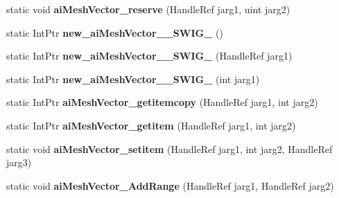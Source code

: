 \begin{DoxyCompactItemize}
\item 
\hypertarget{class_assimp_p_i_n_v_o_k_e_a12dee6d864676a34cd9805d45c8de3a4}{static void {\bfseries ai\+Mesh\+Vector\+\_\+reserve} (Handle\+Ref jarg1, uint jarg2)}\label{class_assimp_p_i_n_v_o_k_e_a12dee6d864676a34cd9805d45c8de3a4}

\item 
\hypertarget{class_assimp_p_i_n_v_o_k_e_a52559ff83c36f308f8678be63025acc4}{static Int\+Ptr {\bfseries new\+\_\+ai\+Mesh\+Vector\+\_\+\+\_\+\+S\+W\+I\+G\+\_} ()}\label{class_assimp_p_i_n_v_o_k_e_a52559ff83c36f308f8678be63025acc4}

\item 
\hypertarget{class_assimp_p_i_n_v_o_k_e_ab803f1850a9ef82ff76f1573cf144b76}{static Int\+Ptr {\bfseries new\+\_\+ai\+Mesh\+Vector\+\_\+\+\_\+\+S\+W\+I\+G\+\_} (Handle\+Ref jarg1)}\label{class_assimp_p_i_n_v_o_k_e_ab803f1850a9ef82ff76f1573cf144b76}

\item 
\hypertarget{class_assimp_p_i_n_v_o_k_e_a1f8a8a244150fac1e46321d5071c5dfd}{static Int\+Ptr {\bfseries new\+\_\+ai\+Mesh\+Vector\+\_\+\+\_\+\+S\+W\+I\+G\+\_} (int jarg1)}\label{class_assimp_p_i_n_v_o_k_e_a1f8a8a244150fac1e46321d5071c5dfd}

\item 
\hypertarget{class_assimp_p_i_n_v_o_k_e_a2fdd64f68333626199ee9cd5f76799d7}{static Int\+Ptr {\bfseries ai\+Mesh\+Vector\+\_\+getitemcopy} (Handle\+Ref jarg1, int jarg2)}\label{class_assimp_p_i_n_v_o_k_e_a2fdd64f68333626199ee9cd5f76799d7}

\item 
\hypertarget{class_assimp_p_i_n_v_o_k_e_aa4cd0684d70f54a82894f98116dbcfa3}{static Int\+Ptr {\bfseries ai\+Mesh\+Vector\+\_\+getitem} (Handle\+Ref jarg1, int jarg2)}\label{class_assimp_p_i_n_v_o_k_e_aa4cd0684d70f54a82894f98116dbcfa3}

\item 
\hypertarget{class_assimp_p_i_n_v_o_k_e_a7aa3ebd693a0bc828566f0b7c25dac85}{static void {\bfseries ai\+Mesh\+Vector\+\_\+setitem} (Handle\+Ref jarg1, int jarg2, Handle\+Ref jarg3)}\label{class_assimp_p_i_n_v_o_k_e_a7aa3ebd693a0bc828566f0b7c25dac85}

\item 
\hypertarget{class_assimp_p_i_n_v_o_k_e_acd4fbfd94553478a45c4e4248041272e}{static void {\bfseries ai\+Mesh\+Vector\+\_\+\+Add\+Range} (Handle\+Ref jarg1, Handle\+Ref jarg2)}\label{class_assimp_p_i_n_v_o_k_e_acd4fbfd94553478a45c4e4248041272e}


\end{DoxyCompactItemize}
